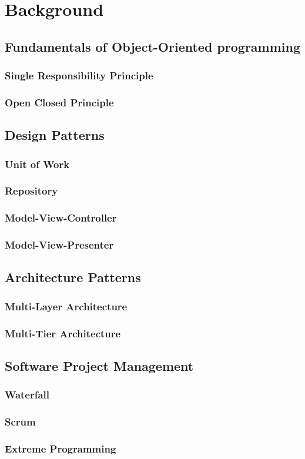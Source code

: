 \chapter{Background}
\section{Fundamentals of Object-Oriented programming}
\subsection{Single Responsibility Principle}
\subsection{Open Closed Principle}

\section{Design Patterns}
\subsection{Unit of Work}
\subsection{Repository}
\subsection{Model-View-Controller}
\subsection{Model-View-Presenter}

\section{Architecture Patterns}
\subsection{Multi-Layer Architecture}
\subsection{Multi-Tier Architecture}

\section{Software Project Management}
\subsection{Waterfall}
\subsection{Scrum}
\subsection{Extreme Programming}
\newpage
